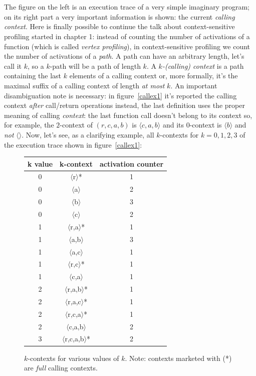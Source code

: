 \documentclass[a4paper,11pt]{report}
\begin{document}
\mbox{}\\ \mbox{}\\
The figure on the left is an execution trace of a very simple imaginary program; on its right part a very important information is shown: the current \emph{calling context}. 
Here is finally possible to continue the talk about context-sensitive profiling started in chapter 1: instead of counting the number of activations of a function (which is called \emph{vertex profiling}), in context-sensitive profiling we count the number of activations of a \emph{path}. A path can have an arbitrary length, let's call it $k$, so a $k$-path will be a path of length $k$. A \emph{\mbox{$k$-(calling)} context} is a path containing the last $k$ elements of a calling context or, more formally, it's the maximal suffix of a calling context of length \emph{at most} $k$.
An important disambiguation note is necessary: in figure~\ref{callex1} it's reported the calling context \emph{after} call/return operations instead, the last definition uses the proper meaning of calling \emph{context}: the last function call doesn't belong to its context so, for example, the $2$-context of $(r,c,a,b)$ is $\langle c,a,b\rangle$ and its $0$-context is $\langle b\rangle$ and \emph{not} $\langle\rangle$.
Now, let's see, as a clarifying example, all $k$-contexts for $k=0,1,2,3$ of the execution trace shown in figure~\ref{callex1}:

\begin{figure}[h]
\begin{center}
\begin{tabular}{c|c|c}
\textbf{k value} & \textbf{k-context} & \textbf{activation counter}\\
\hline
0 & $\langle$r$\rangle$* & 1\\
0 & $\langle$a$\rangle$ & 2\\
0 & $\langle$b$\rangle$ & 3\\
0 & $\langle$c$\rangle$ & 2\\
\hline
1 & $\langle$r,a$\rangle$* & 1\\
1 & $\langle$a,b$\rangle$ & 3\\
1 & $\langle$a,c$\rangle$ & 1\\
1 & $\langle$r,c$\rangle$* & 1\\
1 & $\langle$c,a$\rangle$ & 1\\
\hline
2 & $\langle$r,a,b$\rangle$* & 1\\
2 & $\langle$r,a,c$\rangle$* & 1\\
2 & $\langle$r,c,a$\rangle$* & 1\\
2 & $\langle$c,a,b$\rangle$ & 2\\
\hline
3 & $\langle$r,c,a,b$\rangle$* & 2\\

\end{tabular}
\end{center}
\caption{$k$-contexts for various values of $k$.
Note: contexts marketed with (*) are \emph{full} calling contexts.}
\end{figure}
\end{document}
